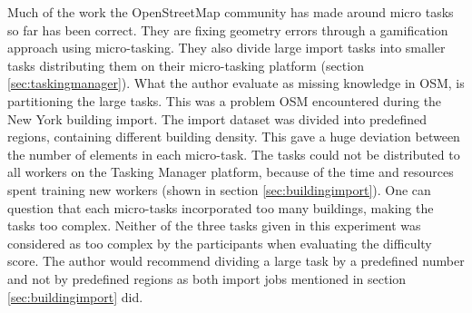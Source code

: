 Much of the work the OpenStreetMap community has made around micro tasks so far has been correct. They are fixing geometry errors through a gamification approach using micro-tasking. They also divide large import tasks into smaller tasks distributing them on their micro-tasking platform (section \ref{sec:taskingmanager}). What the author evaluate as missing knowledge in OSM, is partitioning the large tasks. This was a problem OSM encountered during the New York building import. The import dataset was divided into predefined regions, containing different building density. This gave a huge deviation between the number of elements in each micro-task. The tasks could not be distributed to all workers on the Tasking Manager platform, because of the time and resources spent training new workers (shown in section \ref{sec:buildingimport}). One can question that each micro-tasks incorporated too many buildings, making the tasks too complex. Neither of the three tasks given in this experiment was considered as too complex by the participants when evaluating the difficulty score. The author would recommend dividing a large task by a predefined number and not by predefined regions as both import jobs mentioned in section \ref{sec:buildingimport} did.




